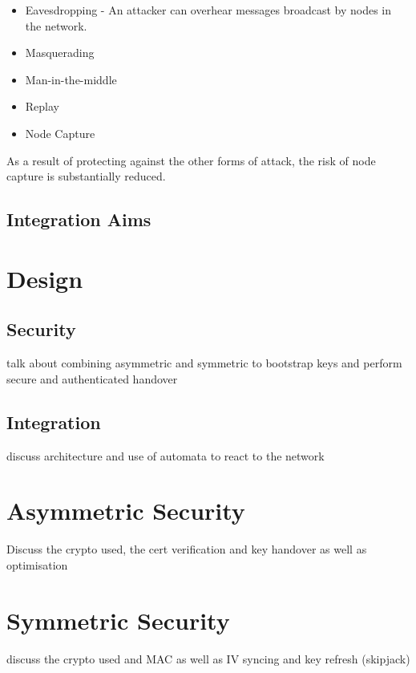 \documentclass[conference]{./sty/IEEEtran}
\begin{document}
\begin{itemize}
  \item Eavesdropping - An attacker can overhear messages broadcast by nodes in the network. 
  \item Masquerading
  \item Man-in-the-middle
  \item Replay
  \item Node Capture
\end{itemize}
As a result of protecting against the other forms of attack, the risk of node capture is substantially reduced.
\subsection{Integration Aims} %
\label{sub:integration_aims}


\section{Design} %
\label{sec:design}

\subsection{Security} %
\label{sub:security}
talk about combining asymmetric and symmetric to bootstrap keys and perform secure and authenticated handover
\subsection{Integration} %
\label{sub:design_integration}
discuss architecture and use of automata to react to the network

\section{Asymmetric Security} %
\label{sec:asymmetric_security}
Discuss the crypto used, the cert verification and key handover as well as optimisation

\section{Symmetric Security} %
\label{sec:symmetric_security}
discuss the crypto used and MAC
as well as IV syncing and key refresh (skipjack)
\end{document}
